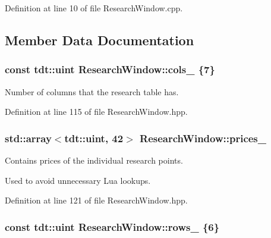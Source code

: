 Definition at line 10 of file Research\+Window.\+cpp.



\subsection{Member Data Documentation}
\subsubsection[{\texorpdfstring{cols\+\_\+}{cols_}}]{\setlength{\rightskip}{0pt plus 5cm}const tdt\+::uint Research\+Window\+::cols\+\_\+ \{7\}\hspace{0.3cm}{\ttfamily [private]}}\hypertarget{class_research_window_a52c91c5c4aded859123aa455b57820e1}{}\label{class_research_window_a52c91c5c4aded859123aa455b57820e1}


Number of columns that the research table has. 



Definition at line 115 of file Research\+Window.\+hpp.

\subsubsection[{\texorpdfstring{prices\+\_\+}{prices_}}]{\setlength{\rightskip}{0pt plus 5cm}std\+::array$<$tdt\+::uint, 42$>$ Research\+Window\+::prices\+\_\+\hspace{0.3cm}{\ttfamily [private]}}\hypertarget{class_research_window_afee1be8c37a9c599b2d56a12258f1a8f}{}\label{class_research_window_afee1be8c37a9c599b2d56a12258f1a8f}


Contains prices of the individual research points. 

Used to avoid unnecessary Lua lookups. 

Definition at line 121 of file Research\+Window.\+hpp.

\subsubsection[{\texorpdfstring{rows\+\_\+}{rows_}}]{\setlength{\rightskip}{0pt plus 5cm}const tdt\+::uint Research\+Window\+::rows\+\_\+ \{6\}\hspace{0.3cm}{\ttfamily [private]}}\hypertarget{class_research_window_aae4b998d4c40d8f05029968abb783c83}{}\label{class_research_window_aae4b998d4c40d8f05029968abb783c83}


